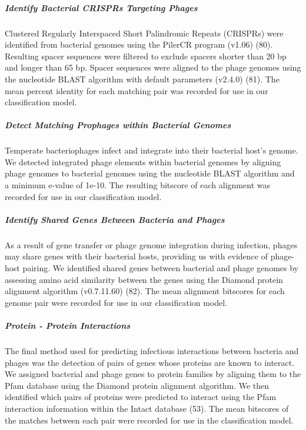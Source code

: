 \documentclass[12pt,]{article}
\let\oldsubparagraph\subparagraph
\renewcommand{\subparagraph}[1]{\oldsubparagraph{#1}\mbox{}}
\begin{document}
\subparagraph{Identify Bacterial CRISPRs Targeting
Phages}\label{identify-bacterial-crisprs-targeting-phages}

Clustered Regularly Interspaced Short Palindromic Repeats (CRISPRs) were
identified from bacterial genomes using the PilerCR program (v1.06)
(80). Resulting spacer sequences were filtered to exclude spacers
shorter than 20 bp and longer than 65 bp. Spacer sequences were aligned
to the phage genomes using the nucleotide BLAST algorithm with default
parameters (v2.4.0) (81). The mean percent identity for each matching
pair was recorded for use in our classification model.

\subparagraph{Detect Matching Prophages within Bacterial
Genomes}\label{detect-matching-prophages-within-bacterial-genomes}

Temperate bacteriophages infect and integrate into their bacterial
host's genome. We detected integrated phage elements within bacterial
genomes by aligning phage genomes to bacterial genomes using the
nucleotide BLAST algorithm and a minimum e-value of 1e-10. The resulting
bitscore of each alignment was recorded for use in our classification
model.

\subparagraph{Identify Shared Genes Between Bacteria and
Phages}\label{identify-shared-genes-between-bacteria-and-phages}

As a result of gene transfer or phage genome integration during
infection, phages may share genes with their bacterial hosts, providing
us with evidence of phage-host pairing. We identified shared genes
between bacterial and phage genomes by assessing amino acid similarity
between the genes using the Diamond protein alignment algorithm
(v0.7.11.60) (82). The mean alignment bitscores for each genome pair
were recorded for use in our classification model.

\subparagraph{Protein - Protein
Interactions}\label{protein---protein-interactions}

The final method used for predicting infectious interactions between
bacteria and phages was the detection of pairs of genes whose proteins
are known to interact. We assigned bacterial and phage genes to protein
families by aligning them to the Pfam database using the Diamond protein
alignment algorithm. We then identified which pairs of proteins were
predicted to interact using the Pfam interaction information within the
Intact database (53). The mean bitscores of the matches between each
pair were recorded for use in the classification model.
\end{document}
